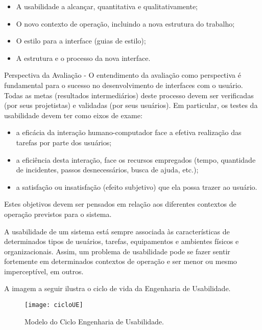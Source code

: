 		\begin{itemize}
			\item{A usabilidade a alcançar, quantitativa e qualitativamente;}
			\item{O novo contexto de operação, incluindo a nova estrutura do trabalho;}
			\item{O estilo para a interface (guias de estilo);}
			\item{A estrutura e o processo da nova interface.}
		\end{itemize}

		Perspectiva da Avaliação - O entendimento da avaliação como perspectiva é fundamental para o sucesso no desenvolvimento de interfaces com o usuário. Todas as metas (resultados intermediários) deste processo devem ser verificadas (por seus projetistas) e validadas (por seus usuários). Em particular, os testes da usabilidade devem ter como eixos de exame:

		\begin{itemize}
			\item{a eficácia da interação humano-computador face a efetiva realização das tarefas por parte dos usuários;}
			\item{a eficiência desta interação, face os recursos empregados (tempo, quantidade de incidentes, passos desnecessários, busca de ajuda, etc.);}
			\item{a satisfação ou insatisfação (efeito subjetivo) que ela possa trazer ao usuário.}
		\end{itemize}

		Estes objetivos devem ser pensados em relação aos diferentes contextos de operação previstos para o sistema.
		
		A usabilidade de um sistema está sempre associada às características de determinados tipos de usuários, tarefas, equipamentos e ambientes físicos e organizacionais. Assim, um problema de usabilidade pode se fazer sentir fortemente em determinados contextos de operação e ser menor ou mesmo imperceptível, em outros.

		A imagem a seguir ilustra o ciclo de vida da Engenharia de Usabilidade.

		\begin{figure}[h]
			\centering
			\texttt{[image: cicloUE]}
			\caption[Modelo do Ciclo Engenharia de Usabilidade]{Modelo do Ciclo Engenharia de Usabilidade. \cite{designEInteracao}}
			\label{fig:cicloUE}
		\end{figure}
